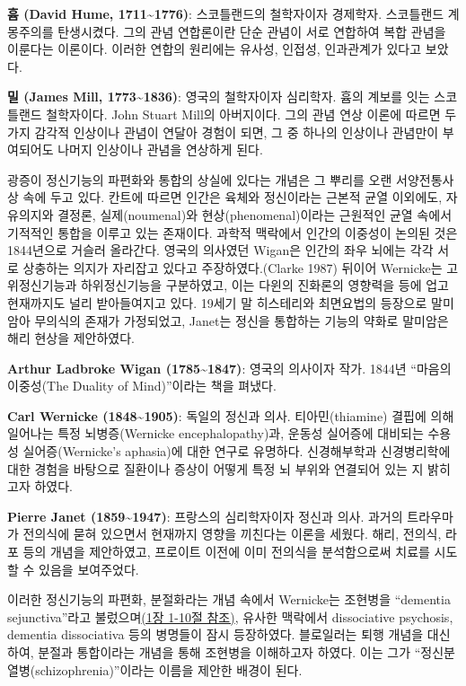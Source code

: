 \documentclass[
]{article}
\begin{document}
\textbf{흄 (David Hume, 1711\textasciitilde1776)}: 스코틀랜드의
철학자이자 경제학자. 스코틀랜드 계몽주의를 탄생시켰다. 그의 관념
연합론이란 단순 관념이 서로 연합하여 복합 관념을 이룬다는 이론이다.
이러한 연합의 원리에는 유사성, 인접성, 인과관계가 있다고 보았다.

\textbf{밀 (James Mill, 1773\textasciitilde1836)}: 영국의 철학자이자
심리학자. 흄의 계보를 잇는 스코틀랜드 철학자이다. John Stuart Mill의
아버지이다. 그의 관념 연상 이론에 따르면 두 가지 감각적 인상이나 관념이
연달아 경험이 되면, 그 중 하나의 인상이나 관념만이 부여되어도 나머지
인상이나 관념을 연상하게 된다.

광증이 정신기능의 파편화와 통합의 상실에 있다는 개념은 그 뿌리를 오랜
서양전통사상 속에 두고 있다. 칸트에 따르면 인간은 육체와 정신이라는
근본적 균열 이외에도, 자유의지와 결정론, 실제(noumenal)와
현상(phenomenal)이라는 근원적인 균열 속에서 기적적인 통합을 이루고 있는
존재이다. 과학적 맥락에서 인간의 이중성이 논의된 것은 1844년으로 거슬러
올라간다. 영국의 의사였던 Wigan은 인간의 좌우 뇌에는 각각 서로 상충하는
의지가 자리잡고 있다고 주장하였다.(Clarke 1987) 뒤이어 Wernicke는
고위정신기능과 하위정신기능을 구분하였고, 이는 다윈의 진화론의 영향력을
등에 업고 현재까지도 널리 받아들여지고 있다. 19세기 말 히스테리와
최면요법의 등장으로 말미암아 무의식의 존재가 가정되었고, Janet는 정신을
통합하는 기능의 약화로 말미암은 해리 현상을 제안하였다.

\textbf{Arthur Ladbroke Wigan (1785\textasciitilde1847)}: 영국의
의사이자 작가. 1844년 ``마음의 이중성(The Duality of Mind)''이라는 책을
펴냈다.

\textbf{Carl Wernicke (1848\textasciitilde1905)}: 독일의 정신과 의사.
티아민(thiamine) 결핍에 의해 일어나는 특정 뇌병증(Wernicke
encephalopathy)과, 운동성 실어증에 대비되는 수용성 실어증(Wernicke's
aphasia)에 대한 연구로 유명하다. 신경해부학과 신경병리학에 대한 경험을
바탕으로 질환이나 증상이 어떻게 특정 뇌 부위와 연결되어 있는 지 밝히고자
하였다.

\textbf{Pierre Janet (1859\textasciitilde1947)}: 프랑스의 심리학자이자
정신과 의사. 과거의 트라우마가 전의식에 묻혀 있으면서 현재까지 영향을
끼친다는 이론을 세웠다. 해리, 전의식, 라포 등의 개념을 제안하였고,
프로이트 이전에 이미 전의식을 분석함으로써 치료를 시도할 수 있음을
보여주었다.

이러한 정신기능의 파편화, 분절화라는 개념 속에서 Wernicke는 조현병을
``dementia sejunctiva''라고
불렀으며\protect\hyperlink{wernicke-kleist-leonhard}{(1장 1-10절 참조)},
유사한 맥락에서 dissociative psychosis, dementia dissociativa 등의
병명들이 잠시 등장하였다. 블로일러는 퇴행 개념을 대신하여, 분절과
통합이라는 개념을 통해 조현병을 이해하고자 하였다. 이는 그가
``정신분열병(schizophrenia)''이라는 이름을 제안한 배경이 된다.
\end{document}
